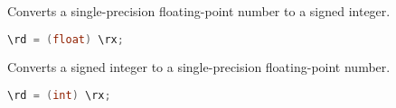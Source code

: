 Converts a single-precision floating-point number to a signed integer.

\begin{lstlisting}[numbers=none, basicstyle=\ttfamily\footnotesize, language=C++]
\rd = (float) \rx;
\end{lstlisting}

Converts a signed integer to a single-precision floating-point number.

\begin{lstlisting}[numbers=none, basicstyle=\ttfamily\footnotesize, language=C++]
\rd = (int) \rx;
\end{lstlisting}
